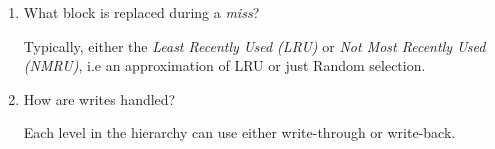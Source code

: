 \documentclass[12pt]{article}
\newenvironment{QandA}{\begin{enumerate}[label=\bfseries\arabic*.]\bfseries}
                      {\end{enumerate}}
\newenvironment{answered}{\par\quad\normalfont}{}
\begin{document}
\begin{QandA}
\item What block is replaced during a \textit{miss}?
\begin{answered}
Typically, either the \textit{Least Recently Used (LRU)} or \textit{Not Most Recently Used (NMRU)}, i.e an approximation of LRU or just Random selection.
\end{answered}

\item How are writes handled?
\begin{answered}
Each level in the hierarchy can use either write-through or write-back. 
\end{answered}

\end{QandA}
\end{document}
